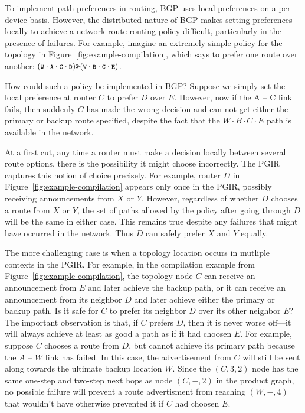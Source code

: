 
To implement path preferences in routing, BGP uses local preferences on a per-device basis. However, the distributed nature of BGP makes setting preferences locally to achieve a network-route routing policy difficult, particularly in the presence of failures. For example, imagine an extremely simple policy for the topology in Figure~\ref{fig:example-compilation}, which says to prefer one route over another:
%
$(\CD{W} \cdot \CD{A} \cdot \CD{C} \cdot \CD{D}) \Prefer (\CD{W} \cdot \CD{B} \cdot \CD{C} \cdot \CD{E})$.
%

How could such a policy be implemented in BGP? Suppose we simply set the local preference at router $C$ to prefer $D$ over $E$. However, now if the A -- C link fails, then suddenly $C$ has made the wrong decision and can not get either the primary or backup route specified, despite the fact that the $W \cdot B \cdot C \cdot E$ path is available in the network.

At a first cut, any time a router must make a decision locally between several route options, there is the possibility it might choose incorrectly. The PGIR captures this notion of choice precisely. For example, router $D$ in Figure~\ref{fig:example-compilation} appears only once in the PGIR, possibly receiving announcements from $X$ or $Y$. However, regardless of whether $D$ chooses a route from $X$ or $Y$, the set of paths allowed by the policy after going through $D$ will be the same in either case. This remains true despite any failures that might have occurred in the network. Thus $D$ can safely prefer $X$ and $Y$ equally.

The more challenging case is when a topology location occurs in mutliple contexts in the PGIR. For example, in the compilation example from Figure~\ref{fig:example-compilation}, the topology node $C$ can receive an announcement from $E$ and later achieve the backup path, or it can receive an announcement from its neighbor $D$ and later achieve either the primary or backup path. Is it safe for $C$ to prefer its neighbor $D$ over its other neighbor $E$? The important observation is that, if $C$ prefers $D$, then it is never worse off---it will always achieve at least as good a path as if it had choosen $E$.
For example, suppose $C$ chooses a route from $D$, but cannot achieve its primary path because the $A$ -- $W$ link has failed. In this case, the advertisement from $C$ will still be sent along towards the ultimate backup location $W$. Since the $(C,3,2)$ node has the same one-step and two-step next hops as node $(C,-,2)$ in the product graph, no possible failure will prevent a route advertisment from reaching $(W,-,4)$ that wouldn't have otherwise prevented it if $C$ had choosen $E$.

